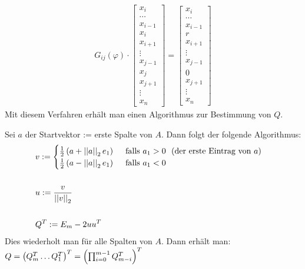 \begin{align*}
    G_{ij} (\varphi) \cdot \begin{bmatrix}
        x_i \\ \cdots \\ x_{i-1} \\ x_i \\ x_{i+1} \\ \vdots \\ x_{j-1} \\ x_j \\ x_{j+1}
        \\ \vdots \\ x_n
    \end{bmatrix}
    =
    \begin{bmatrix}
        x_i \\ \cdots \\ x_{i-1} \\ r \\ x_{i+1} \\ \vdots \\ x_{j-1} \\ 0 \\ x_{j+1}
        \\ \vdots \\ x_n
    \end{bmatrix}
\end{align*}
Mit diesem Verfahren erhält man einen Algorithmus zur Bestimmung von $Q$.

\pagebreak


Sei $a$ der Startvektor := erste Spalte von $A$. Dann folgt der folgende Algorithmus:
\begin{align*}
    &v := \begin{cases}
        \frac{1}{2} \left( a + \left\vert\left\vert a \right\vert\right\vert_2 e_1 \right) \quad \text{ falls } a_1 >0 \ \ (\text{der erste Eintrag von } a)
        \\
        \frac{1}{2} \left( a - \left\vert\left\vert a \right\vert\right\vert_2 e_1 \right) \quad \text{ falls } a_1 < 0
    \end{cases}
    \\
    \\
    &u := \frac{v}{\left\vert\left\vert v \right\vert\right\vert_2}
    \\
    \\
    &Q^T := E_m - 2 u u^T
\end{align*}
Dies wiederholt man für alle Spalten von $A$. Dann erhält man:
$Q = \left( Q_m^T \dots Q_1^T \right)^T = \left( \prod_{i=0}^{m-1} Q_{m-i}^T \right)^T$

